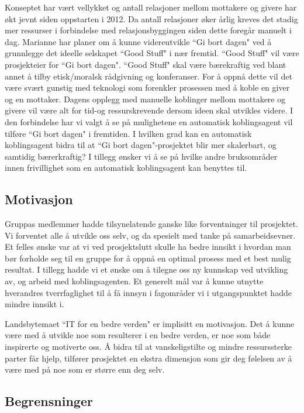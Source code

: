 Konseptet har vært vellykket og antall relasjoner mellom mottakere og givere har økt jevnt siden oppstarten i 2012. Da antall relasjoner øker årlig kreves det stadig mer ressurser i forbindelse med relasjonsbyggingen siden dette foregår manuelt i dag. Marianne har planer om å kunne videreutvikle ``Gi bort dagen" ved å grunnlegge det ideelle selskapet ``Good Stuff" i nær fremtid. ``Good Stuff" vil være prosjekteier for ``Gi bort dagen". ``Good Stuff" skal være bærekraftig ved blant annet å tilby etisk/moralsk rådgivning og konferanser. For å oppnå dette vil det være svært gunstig med teknologi som forenkler prosessen med å koble en giver og en mottaker. Dagens opplegg med manuelle koblinger mellom mottakere og givere vil være alt for tid-og ressurskrevende dersom ideen skal utvikles videre. I den forbindelse har vi valgt å se på mulighetene en automatisk koblingsagent vil tilføre ``Gi bort dagen" i fremtiden. I hvilken grad kan en automatisk koblingsagent bidra til at ``Gi bort dagen"-prosjektet blir mer skalerbart, og samtidig bærerkraftig? I tillegg ønsker vi å se på hvilke andre bruksområder innen frivillighet som en automatisk koblingsagent kan benyttes til.

\subsection{Motivasjon}

Gruppas medlemmer hadde tilsynelatende ganske like forventninger til prosjektet. Vi forventet alle å utvikle oss selv, og da spesielt med tanke på samarbeidsevner. Et felles ønske var at vi ved prosjektslutt skulle ha bedre innsikt i hvordan man bør forholde seg til en gruppe for å oppnå en optimal prosess med et best mulig resultat. I tillegg hadde vi et ønske om å tilegne oss ny kunnskap ved utvikling av, og arbeid med koblingsagenten. Et generelt mål var å kunne utnytte hverandres tverrfaglighet til å få innsyn i fagområder vi i utgangspunktet hadde mindre innsikt i.

Landsbytemaet ``IT for en bedre verden" er implisitt en motivasjon. Det å kunne være med å utvikle noe som resulterer i en bedre verden, er noe som både inspirerte og motiverte oss. Å bidra til at vanskeligstilte og mindre ressurssterke parter får hjelp, tilfører prosjektet en ekstra dimensjon som gir deg følelsen av å være med på noe som er større enn deg selv.

\subsection{Begrensninger}

